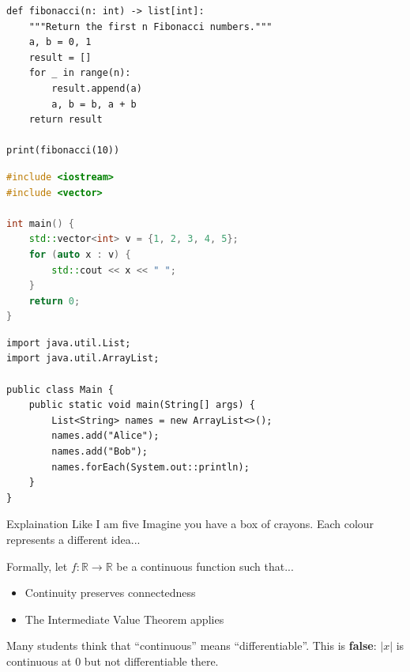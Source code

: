 \documentclass{report}
\begin{document}
\begin{lstlisting}[style=tokyonight, language=Python3, caption=Python example]
def fibonacci(n: int) -> list[int]:
    """Return the first n Fibonacci numbers."""
    a, b = 0, 1
    result = []
    for _ in range(n):
        result.append(a)
        a, b = b, a + b
    return result

print(fibonacci(10))
\end{lstlisting}

\begin{lstlisting}[style=tokyonight, language=CPP, caption=C++ example]
#include <iostream>
#include <vector>

int main() {
    std::vector<int> v = {1, 2, 3, 4, 5};
    for (auto x : v) {
        std::cout << x << " ";
    }
    return 0;
}
\end{lstlisting}

\begin{lstlisting}[style=tokyonight, language=Java8, caption=Java example]
import java.util.List;
import java.util.ArrayList;

public class Main {
    public static void main(String[] args) {
        List<String> names = new ArrayList<>();
        names.add("Alice");
        names.add("Bob");
        names.forEach(System.out::println);
    }
}
\end{lstlisting}

\begin{layerELI5}
	Explaination Like I am five
	Imagine you have a box of crayons. Each colour represents a different idea...
\end{layerELI5}

\begin{layerReal}
	Formally, let $f: \mathbb{R} \to \mathbb{R}$ be a continuous function such that...
\end{layerReal}

\begin{layerTakeaways}
	\begin{itemize}
		\item Continuity preserves connectedness
		\item The Intermediate Value Theorem applies
	\end{itemize}
\end{layerTakeaways}

\begin{misconception}
	Many students think that ``continuous'' means ``differentiable''. This is \textbf{false}: $|x|$ is continuous at 0 but not differentiable there.
\end{misconception}
\end{document}
